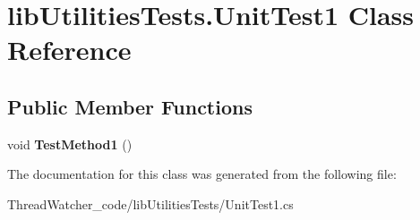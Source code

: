 \hypertarget{classlib_utilities_tests_1_1_unit_test1}{\section{lib\+Utilities\+Tests.\+Unit\+Test1 Class Reference}
\label{classlib_utilities_tests_1_1_unit_test1}
}
\subsection*{Public Member Functions}
\begin{DoxyCompactItemize}
\item 
\hypertarget{classlib_utilities_tests_1_1_unit_test1_a61dc36c6e478124ff84be1a4a34d090b}{void {\bfseries Test\+Method1} ()}\label{classlib_utilities_tests_1_1_unit_test1_a61dc36c6e478124ff84be1a4a34d090b}

\end{DoxyCompactItemize}


The documentation for this class was generated from the following file\+:\begin{DoxyCompactItemize}
\item 
Thread\+Watcher\+\_\+code/lib\+Utilities\+Tests/Unit\+Test1.\+cs\end{DoxyCompactItemize}
